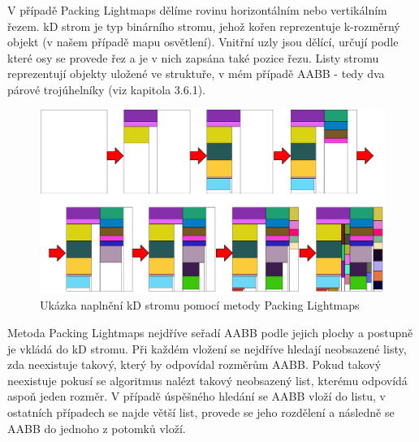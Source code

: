 \documentclass[11pt,twoside,a4paper]{book}
\begin{document}
V případě Packing Lightmaps dělíme rovinu horizontálním nebo vertikálním řezem. kD strom je typ binárního stromu, jehož kořen reprezentuje k-rozměrný objekt (v našem případě mapu osvětlení). Vnitřní uzly jsou dělící, určují podle které osy se provede řez a je v nich zapsána také pozice řezu. Listy stromu reprezentují objekty uložené ve struktuře, v mém případě AABB - tedy dva párové trojúhelníky (viz kapitola 3.6.1).

\begin{center}
\begin{figure}[h]
\includegraphics[width=120mm]{figures/kd.png}
\caption{Ukázka naplnění kD stromu pomocí metody Packing Lightmaps}
\end{figure}
\end{center}

Metoda Packing Lightmaps nejdříve seřadí AABB podle jejich plochy a postupně je vkládá do kD stromu. Při každém vložení se nejdříve hledají neobsazené listy, zda neexistuje takový, který by odpovídal rozměrům AABB. Pokud takový neexistuje pokusí se algoritmus nalézt takový neobsazený list, kterému odpovídá aspoň jeden rozměr. V případě úspěšného hledání se AABB vloží do listu, v ostatních případech se najde větší list, provede se jeho rozdělení a následně se AABB do jednoho z potomků vloží.
\newpage
\end{document}
